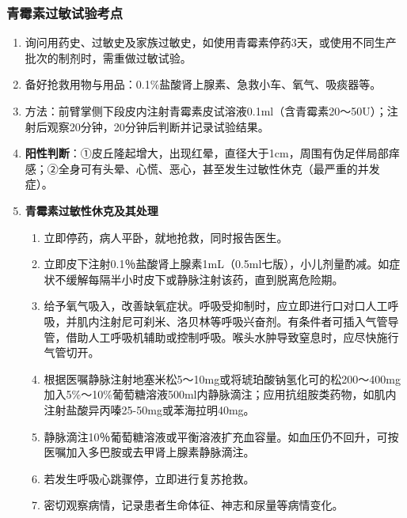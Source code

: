 \documentclass[11pt, a4paper]{ctexart}
\begin{document}
\subsubsection{青霉素过敏试验考点}
\begin{enumerate}
    \item 询问用药史、过敏史及家族过敏史，如使用青霉素停药3天，或使用不同生产批次的制剂时，需重做过敏试验。
    \item 备好抢救用物与用品：0.1\%盐酸肾上腺素、急救小车、氧气、吸痰器等。
    \item 方法：前臂掌侧下段皮内注射青霉素皮试溶液0.1ml（含青霉素20～50U）；注射后观察20分钟，20分钟后判断并记录试验结果。
    \item \textbf{阳性判断}：①皮丘隆起增大，出现红晕，直径大于1cm，周围有伪足伴局部痒感；②全身可有头晕、心慌、恶心，甚至发生过敏性休克（最严重的并发症）。
    \item \textbf{青霉素过敏性休克及其处理}
    \begin{enumerate}
        \item 立即停药，病人平卧，就地抢救，同时报告医生。
        \item 立即皮下注射0.1％盐酸肾上腺素1mL（0.5ml七版），小儿剂量酌减。如症状不缓解每隔半小时皮下或静脉注射该药，直到脱离危险期。
        \item 给予氧气吸入，改善缺氧症状。呼吸受抑制时，应立即进行口对口人工呼吸，并肌内注射尼可刹米、洛贝林等呼吸兴奋剂。有条件者可插入气管导管，借助人工呼吸机辅助或控制呼吸。喉头水肿导致窒息时，应尽快施行气管切开。
        \item 根据医嘱静脉注射地塞米松5～10mg或将琥珀酸钠氢化可的松200～400mg加入5\%～10\%葡萄糖溶液500ml内静脉滴注；应用抗组胺类药物，如肌内注射盐酸异丙嗪25-50mg或苯海拉明40mg。
        \item 静脉滴注10％葡萄糖溶液或平衡溶液扩充血容量。如血压仍不回升，可按医嘱加入多巴胺或去甲肾上腺素静脉滴注。
        \item 若发生呼吸心跳骤停，立即进行复苏抢救。
        \item 密切观察病情，记录患者生命体征、神志和尿量等病情变化。
    \end{enumerate}
\end{enumerate}
\end{document}
